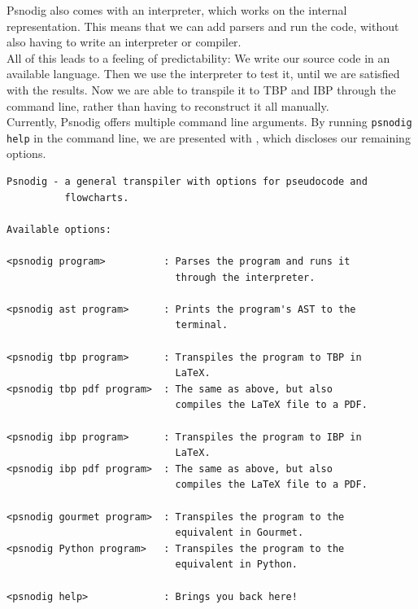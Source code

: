 Psnodig also comes with an interpreter, which works on the internal representation. This means that we can add parsers and run the code, without also having to write an interpreter or compiler. \\

All of this leads to a feeling of predictability: We write our source code in an available language. Then we use the interpreter to test it, until we are satisfied with the results. Now we are able to transpile it to TBP and IBP through the command line, rather than having to reconstruct it all manually. \\

Currently, Psnodig offers multiple command line arguments. By running \texttt{psnodig help} in the command line, we are presented with , which discloses our remaining options. \\

\begin{lstlisting}[caption={The command line options for Psnodig, presented by running \texttt{psnodig help} in the terminal.}, captionpos=b, label={psnodigCMDoptions}]
Psnodig - a general transpiler with options for pseudocode and
          flowcharts.

Available options:

<psnodig program>          : Parses the program and runs it
                             through the interpreter.

<psnodig ast program>      : Prints the program's AST to the
                             terminal.

<psnodig tbp program>      : Transpiles the program to TBP in
                             LaTeX.
<psnodig tbp pdf program>  : The same as above, but also
                             compiles the LaTeX file to a PDF.

<psnodig ibp program>      : Transpiles the program to IBP in
                             LaTeX.
<psnodig ibp pdf program>  : The same as above, but also
                             compiles the LaTeX file to a PDF.

<psnodig gourmet program>  : Transpiles the program to the
                             equivalent in Gourmet.
<psnodig Python program>   : Transpiles the program to the
                             equivalent in Python.

<psnodig help>             : Brings you back here!
\end{lstlisting}


